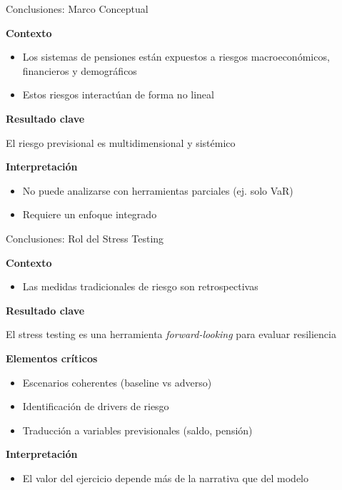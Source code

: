 \documentclass{beamer}
\begin{document}
\begin{frame}{Conclusiones: Marco Conceptual}

\textbf{Contexto}
\begin{itemize}
\item Los sistemas de pensiones están expuestos a riesgos macroeconómicos, financieros y demográficos
\item Estos riesgos interactúan de forma no lineal
\end{itemize}

\vspace{0.3cm}

\textbf{Resultado clave}
\begin{block}{}
El riesgo previsional es multidimensional y sistémico
\end{block}

\vspace{0.3cm}

\textbf{Interpretación}
\begin{itemize}
\item No puede analizarse con herramientas parciales (ej. solo VaR)
\item Requiere un enfoque integrado
\end{itemize}

\end{frame}

\begin{frame}{Conclusiones: Rol del Stress Testing}

\textbf{Contexto}
\begin{itemize}
\item Las medidas tradicionales de riesgo son retrospectivas
\end{itemize}

\vspace{0.3cm}

\textbf{Resultado clave}
\begin{block}{}
El stress testing es una herramienta \textit{forward-looking} para evaluar resiliencia
\end{block}

\vspace{0.3cm}

\textbf{Elementos críticos}
\begin{itemize}
\item Escenarios coherentes (baseline vs adverso)
\item Identificación de drivers de riesgo
\item Traducción a variables previsionales (saldo, pensión)
\end{itemize}

\vspace{0.3cm}

\textbf{Interpretación}
\begin{itemize}
\item El valor del ejercicio depende más de la narrativa que del modelo
\end{itemize}

\end{frame}
\end{document}
